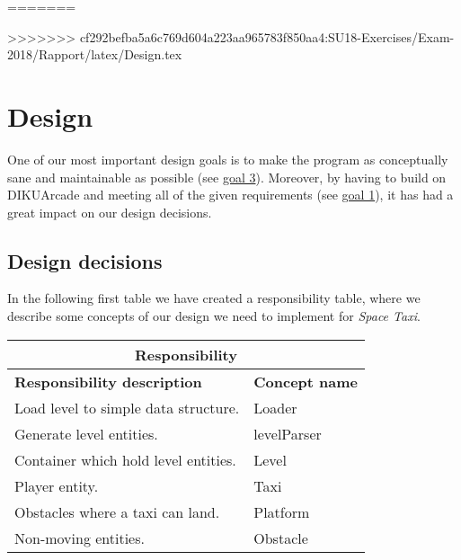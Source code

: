 \documentclass[../master.tex]{subfile}
\begin{document}
=======

>>>>>>> cf292befba5a6c769d604a223aa965783f850aa4:SU18-Exercises/Exam-2018/Rapport/latex/Design.tex
\section{Design}
One of our most important design goals is to make the program as conceptually sane and maintainable as possible (see \hyperref[sec:Goal3]{goal 3}). Moreover, by having to build on DIKUArcade and meeting all of the given requirements (see \hyperref[sec:Goal1]{goal 1}), it has had a great impact on our design decisions.

\subsection{Design decisions}
In the following first table we have created a responsibility table, where we describe some concepts of our design we need to implement for \textit{Space Taxi}.
\renewcommand{\arraystretch}{1.5}

\newpage

\begin{table}[h]
	\centering
	\label{my-label}
	\begin{tabular}{|l||l|}
		\hline
		\multicolumn{2}{|c|}{\textbf{Responsibility}}                                     \\ \hline
		\multicolumn{1}{|l||}{\textbf{Responsibility description}} & \multicolumn{1}{l|}{\textbf{Concept name}} \\ \hline
		Load level to simple data structure.         & Loader                                     \\ \hline
		Generate level entities.                     & levelParser                                \\ \hline
		Container which hold level entities.         & Level                                      \\ \hline
		Player entity.                               & Taxi                                       \\ \hline
		Obstacles where a taxi can land.             & Platform                                   \\ \hline
		Non-moving entities.                         & Obstacle                                   \\ \hline
	\end{tabular}
\end{table}
\end{document}
